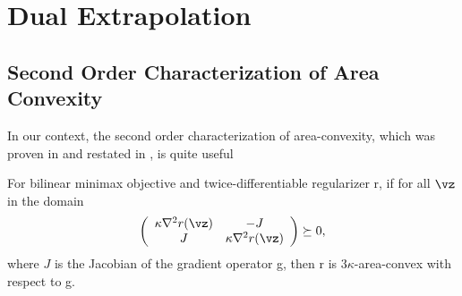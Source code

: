 
\section{Dual Extrapolation}
\subsection{Second Order Characterization of Area Convexity}
In our context, the second order characterization of area-convexity, which was proven in \citep[Theorem 1.6]{Sherman-2017-Area} and restated in \citep[Theorem 3.2]{Jambulapati-2019-Direct}, is quite useful
\begin{theorem} \label{theorem:2nd_order_area_convex}
    For bilinear minimax objective and twice-differentiable regularizer r, if for all $\vz$ in the domain
    \begin{equation*}
        \left(
        \begin{array}{cc}
        \kappa \nabla^2 r(\vz) & -J \\
        J & \kappa \nabla^2 r(\vz)
        \end{array} \right) \succeq 0,
    \end{equation*}
    where $J$ is the Jacobian of the gradient operator g, then r is $3 \kappa$-area-convex with respect to g. 
\end{theorem} 
